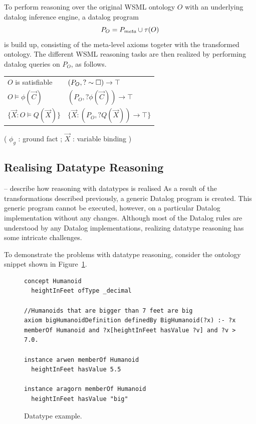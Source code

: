 To perform reasoning over the original WSML ontology $O$ with an
underlying datalog inference engine, a datalog program
\begin{displaymath}
    P_O = \mlaxioms \cup \tau(O)
\end{displaymath}
is build up, consisting of the meta-level axioms togeter with the
transformed ontology. The different WSML reasoning tasks are then
realized by performing datalog queries on $P_O$, as follows.
\begin{small}
\begin{tabular}{|l|l|}
  \hline
  $O$ is satisfiable & $(P_O, ?\sim \square) \rightarrow \top$ \\
  $O \models \phi(\vec{C})$ & $(P_O, ?\phi(\vec{C})) \rightarrow \top$ \\
  $\{\vec{X} : O \models Q(\vec{X})\}$ & $\{\vec{X} : (P_O, ?Q(\vec{X})) \rightarrow \top\}$ \\
 \hline
\end{tabular}
\end{small}

( $\phi_g$ : ground fact ; $\vec{X}$ : variable binding )


\subsection{Realising Datatype Reasoning}
-- describe how reasoning with datatypes is realised As a result
of the transformations described previously, a generic Datalog
program is created. This generic program cannot be executed,
however, on a particular Datalog implementation without any
changes. Although most of the Datalog rules are understood by any
Datalog implementations, realizing datatype reasoning has some
intricate challenges.

To demonstrate the problems with datatype reasoning, consider the
ontology snippet shown in Figure~\ref{fig:datatype_example}.

\begin{figure}[hbt]
\centering
\begin{lstlisting}[style=wsml, frame=none]
concept Humanoid
  heightInFeet ofType _decimal

//Humanoids that are bigger than 7 feet are big
axiom bigHumanoidDefinition definedBy BigHumanoid(?x) :- ?x
memberOf Humanoid and ?x[heightInFeet hasValue ?v] and ?v > 7.0.

instance arwen memberOf Humanoid
  heightInFeet hasValue 5.5

instance aragorn memberOf Humanoid
  heightInFeet hasValue "big"
\end{lstlisting}
 \caption{Datatype example. \label{fig:datatype_example}}
\end{figure}

